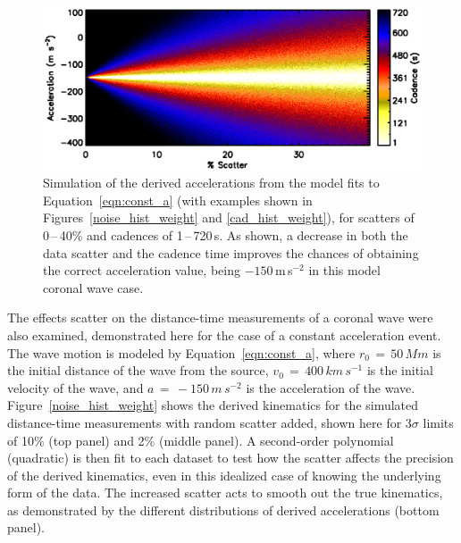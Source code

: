 \documentclass[structabstract]{aa}
\begin{document}
\begin{figure}[!b]
\begin{center}
\includegraphics[scale=0.53, trim=20 10 0 20]{images/fig_noise_cad.eps}
\caption{Simulation of the derived accelerations from the model fits to Equation~\ref{eqn:const_a} (with examples shown in Figures~\ref{noise_hist_weight} and \ref{cad_hist_weight}), for scatters of 0\,--\,40\% and cadences of 1\,--\,720\,s. As shown, a decrease in both the data scatter and the cadence time improves the chances of obtaining the correct acceleration value, being $-150$\,m\,s$^{-2}$ in this model coronal wave case.}
\label{noise_test_image}
\end{center}
\end{figure}

The effects scatter on the distance-time measurements of a coronal wave were also examined, demonstrated here for the case of a constant acceleration event. The wave motion is modeled by Equation~\ref{eqn:const_a}, where $r_0\,=\,50\,Mm$ is the initial distance of the wave from the source, $v_0\,=\,400\,km\,s^{-1}$ is the initial velocity of the wave, and $a\,=\,-150\,m\,s^{-2}$ is the acceleration of the wave. Figure~\ref{noise_hist_weight} shows the derived kinematics for the simulated distance-time measurements with random scatter added, shown here for 3$\sigma$ limits of 10\% (top panel) and 2\% (middle panel). A second-order polynomial (quadratic) is then fit to each dataset to test how the scatter affects the precision of the derived kinematics, even in this idealized case of knowing the underlying form of the data. The increased scatter acts to smooth out the true kinematics, as demonstrated by the different distributions of derived accelerations (bottom panel).
\end{document}

